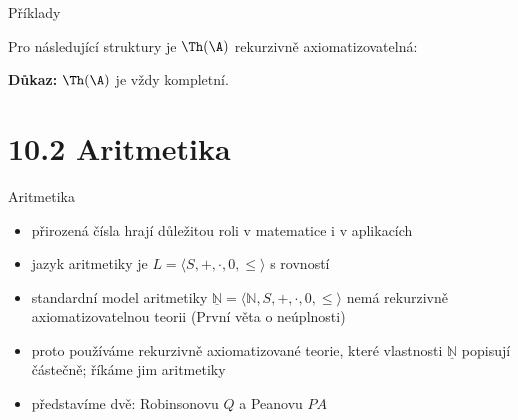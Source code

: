 \documentclass{beamer}
\begin{document}
\begin{frame}{Příklady}

    Pro následující struktury je $\Th(\A)$ rekurzivně axiomatizovatelná:


    \medskip

    \textbf{Důkaz:} $\Th(\A)$ je vždy kompletní.


\end{frame}


\section{10.2 Aritmetika}


\begin{frame}{Aritmetika}

    \begin{itemize}
        \item přirozená čísla hrají důležitou roli v matematice i v aplikacích
        \item \alert{jazyk aritmetiky} je $L=\langle S,+,\cdot,0,\leq\rangle$ s rovností
        \item \alert{standardní model aritmetiky}  $\underline{\mathbb N}=\langle\mathbb N,S,+,\cdot,0,\leq\rangle$ nemá rekurzivně axiomatizovatelnou teorii (První věta o neúplnosti)
        \item proto používáme rekurzivně axiomatizované teorie, které vlastnosti $\underline{\mathbb N}$ popisují částečně; říkáme jim \alert{aritmetiky}       
        \item představíme dvě: \alert{Robinsonovu} $Q$ a \alert{Peanovu} $PA$
    \end{itemize}

\end{frame}
\end{document}
